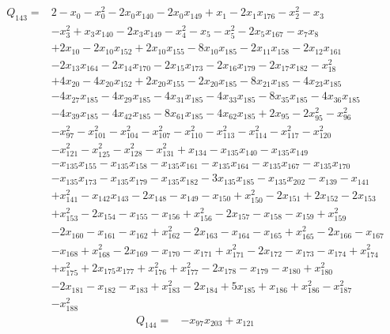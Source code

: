 \begin{equation*}\begin{aligned}
Q_{143}={}& 2-x_{0}-x_{0}^{2}-2x_{0}x_{140}-2x_{0}x_{149}+x_{1}-2x_{1}x_{176}-x_{2}^{2}-x_{3}\\
& -x_{3}^{2}+x_{3}x_{140}-2x_{3}x_{149}-x_{4}^{2}-x_{5}-x_{5}^{2}-2x_{5}x_{167}-x_{7}x_{8}\\
& +2x_{10}-2x_{10}x_{152}+2x_{10}x_{155}-8x_{10}x_{185}-2x_{11}x_{158}-2x_{12}x_{161}\\
& -2x_{13}x_{164}-2x_{14}x_{170}-2x_{15}x_{173}-2x_{16}x_{179}-2x_{17}x_{182}-x_{18}^{2}\\
& +4x_{20}-4x_{20}x_{152}+2x_{20}x_{155}-2x_{20}x_{185}-8x_{21}x_{185}-4x_{23}x_{185}\\
& -4x_{27}x_{185}-4x_{29}x_{185}-4x_{31}x_{185}-4x_{33}x_{185}-8x_{35}x_{185}-4x_{36}x_{185}\\
& -4x_{39}x_{185}-4x_{42}x_{185}-8x_{61}x_{185}-4x_{62}x_{185}+2x_{95}-2x_{95}^{2}-x_{96}^{2}\\
& -x_{97}^{2}-x_{101}^{2}-x_{104}^{2}-x_{107}^{2}-x_{110}^{2}-x_{113}^{2}-x_{114}^{2}-x_{117}^{2}-x_{120}^{2}\\
& -x_{121}^{2}-x_{125}^{2}-x_{128}^{2}-x_{131}^{2}+x_{134}-x_{135}x_{140}-x_{135}x_{149}\\
& -x_{135}x_{155}-x_{135}x_{158}-x_{135}x_{161}-x_{135}x_{164}-x_{135}x_{167}-x_{135}x_{170}\\
& -x_{135}x_{173}-x_{135}x_{179}-x_{135}x_{182}-3x_{135}x_{185}-x_{135}x_{202}-x_{139}-x_{141}\\
& +x_{141}^{2}-x_{142}x_{143}-2x_{148}-x_{149}-x_{150}+x_{150}^{2}-2x_{151}+2x_{152}-2x_{153}\\
& +x_{153}^{2}-2x_{154}-x_{155}-x_{156}+x_{156}^{2}-2x_{157}-x_{158}-x_{159}+x_{159}^{2}\\
& -2x_{160}-x_{161}-x_{162}+x_{162}^{2}-2x_{163}-x_{164}-x_{165}+x_{165}^{2}-2x_{166}-x_{167}\\
& -x_{168}+x_{168}^{2}-2x_{169}-x_{170}-x_{171}+x_{171}^{2}-2x_{172}-x_{173}-x_{174}+x_{174}^{2}\\
& +x_{175}^{2}+2x_{175}x_{177}+x_{176}^{2}+x_{177}^{2}-2x_{178}-x_{179}-x_{180}+x_{180}^{2}\\
& -2x_{181}-x_{182}-x_{183}+x_{183}^{2}-2x_{184}+5x_{185}+x_{186}+x_{186}^{2}-x_{187}^{2}\\
& -x_{188}^{2}
\end{aligned}\end{equation*}
\begin{equation*}\begin{aligned}
Q_{144}={}& -x_{97}x_{203}+x_{121}
\end{aligned}\end{equation*}

